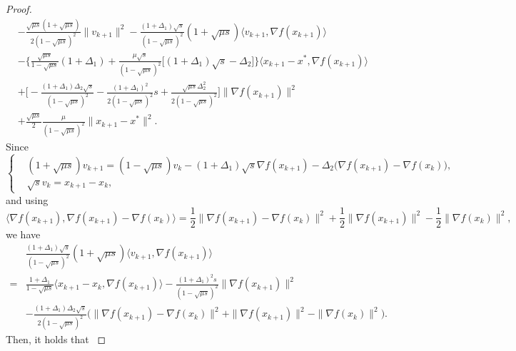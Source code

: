 \documentclass[11pt]{article}
\newcommand{\1}{\mathbf 1}
\numberwithin{equation}{section}
\begin{document}
\begin{proof}
{\begin{align*}
        &-\frac{\sqrt{\mu s}(1+\sqrt{\mu s})}{2(1-\sqrt{\mu s})^2}\|v_{k+1}\|^2
        -\frac{(1+\Delta_1)\sqrt{s}}{(1-\sqrt{\mu s})^2}(1+\sqrt{\mu s})\langle v_{k+1},\nabla f(x_{k+1})\rangle\\
        &-\Big\{\frac{\sqrt{\mu s}}{1-\sqrt{\mu s}}(1+\Delta_1)+\frac{\mu\sqrt{s}}{(1-\sqrt{\mu s})^2}\big[(1+\Delta_1)\sqrt{s}-\Delta_2\big]\Big\}\langle x_{k+1}-x^*,\nabla f(x_{k+1})\rangle\\
        &+\big[-\frac{(1+\Delta_1)\Delta_2\sqrt{s}}{(1-\sqrt{\mu s})^2}-\frac{(1+\Delta_1)^2}{2(1-\sqrt{\mu s})^2}s+\frac{\sqrt{\mu s}\Delta_2^2}{2(1-\sqrt{\mu s})^2}\big]\|\nabla f(x_{k+1})\|^2\\
        &+\frac{\sqrt{\mu s}}{2}\frac{\mu}{(1-\sqrt{\mu s})^2}\|x_{k+1}-x^*\|^2.
        \end{align*}
        Since
        \begin{equation*}
        \left\{
        \begin{aligned}
        & (1+\sqrt{\mu s})v_{k+1}=(1-\sqrt{\mu s})v_k-(1+\Delta_1)\sqrt{s}\nabla f(x_{k+1})-\Delta_2\big(\nabla f(x_{k+1})-\nabla f(x_k)\big),\\
        & \sqrt{s}v_k=x_{k+1}-x_k,
        \end{aligned}
        \right. 
        \end{equation*}
        and using
        \begin{equation*}
	\langle \nabla     
        f(x_{k+1}),\nabla f(x_{k+1})-\nabla f(x_k)\rangle=\frac{1}{2}\|\nabla f(x_{k+1})-\nabla f(x_k)\|^2+\frac{1}{2}\|\nabla f(x_{k+1})\|^2-\frac{1}{2}\|\nabla f(x_k)\|^2,
	\end{equation*}
        we have
        \begin{align*}
            &\frac{(1+\Delta_1)\sqrt{s}}{(1-\sqrt{\mu s})^2}(1+\sqrt{\mu s})\langle v_{k+1}, \nabla f(x_{k+1}) \rangle\\
            =&\frac{1+\Delta_1}{1-\sqrt{\mu s}}\langle x_{k+1}-x_k,\nabla f(x_{k+1}) \rangle - \frac{(1+\Delta_1)^2s}{(1-\sqrt{\mu s})^2}\|\nabla f(x_{k+1})\|^2\\
            &-\frac{(1+\Delta_1)\Delta_2\sqrt{s}}{2(1-\sqrt{\mu s})^2}\big(\|\nabla f(x_{k+1})-\nabla f(x_k)\|^2+\|\nabla f(x_{k+1})\|^2-\|\nabla f(x_k)\|^2\big).
        \end{align*}
        Then, it holds that  
}
\end{proof}
\end{document}
